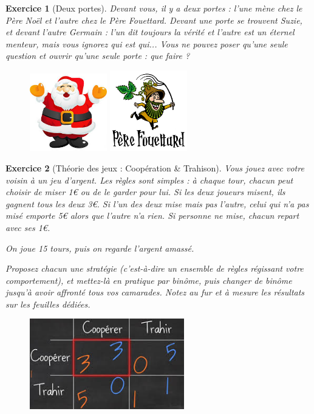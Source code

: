 \documentclass[12pt]{article}
\theoremstyle{break}
\newtheorem{exo}{Exercice}
\begin{document}
\begin{exo}[Deux portes]
Devant vous, il y a deux portes : l'une mène chez le Père Noël et l'autre chez le Père Fouettard. Devant une porte se trouvent Suzie, et devant l'autre Germain : l'un dit toujours la vérité et l'autre est un éternel menteur, mais vous ignorez qui est qui... Vous ne pouvez poser qu'une seule question et ouvrir qu'une seule porte : que faire ?

\begin{figure}[h!]
	\centering
    \includegraphics[width=0.3\textwidth]{PereNoel.jpg}
    \includegraphics[width=0.3\textwidth]{PereFouettard.png}
\end{figure}
\end{exo}


\begin{exo}[Théorie des jeux : Coopération \& Trahison]
Vous jouez avec votre voisin à un jeu d'argent. Les règles sont simples : à chaque tour, chacun peut choisir de miser 1€ ou de le garder pour lui. Si les deux joueurs misent, ils gagnent tous les deux 3€. Si l'un des deux mise mais pas l'autre, celui qui n'a pas misé emporte 5€ alors que l'autre n'a rien. Si personne ne mise, chacun repart avec ses 1€.

On joue 15 tours, puis on regarde l'argent amassé.

Proposez chacun une stratégie (c'est-à-dire un ensemble de règles régissant votre comportement), et mettez-là en pratique par binôme, puis changer de binôme jusqu'à avoir affronté tous vos camarades. Notez au fur et à mesure les résultats sur les feuilles dédiées.

\begin{figure}[h!]
	\centering
    \includegraphics[width=0.6\textwidth]{CooperationTrahison.jpg}
\end{figure}
\end{exo}
\end{document}
